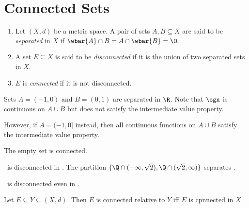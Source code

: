 \section{Connected Sets} \label{sec:connected}
\begin{definition} \label{def:connected} \leavevmode
    \begin{enumerate}[label=(\alph*)]
        \item Let $(X, d)$ be a metric space.
        A pair of sets $A, B \subseteq X$ are said to be \emph{separated} in
        $X$ if $\wbar{A} \cap B = A \cap \wbar{B} = \O.$
        \item A set $E \subseteq X$ is said to be \emph{disconnected} if it
        is the union of two separated sets in $X$.
        \item $E$ is \emph{connected} if it is not disconnected.
    \end{enumerate}
\end{definition}
\begin{examples}
    \item Sets $A = (-1, 0)$ and $B = (0, 1)$ are separated in $\R$.
    Note that $\sgn$ is continuous on $A \cup B$ but does not satisfy the
    intermediate value property.

    However, if $A = (-1, 0]$ instead, then all continuous functions on
    $A \cup B$ satisfy the intermediate value property.
    \item The empty set is connected.
    \item \Q\ is disconnected in \R.
    The partition
    $\{\Q \cap (-\infty, \sqrt 2), \Q \cap (\sqrt 2, \infty)\}$
    separates \Q.
    \item \Q\ is disconnected even in \Q.
\end{examples}
\begin{exercise}
    Let $E \subseteq Y \subseteq (X, d)$.
    Then $E$ is connected relative to $Y$ iff $E$ is cpnnected in $X$.
\end{exercise}

